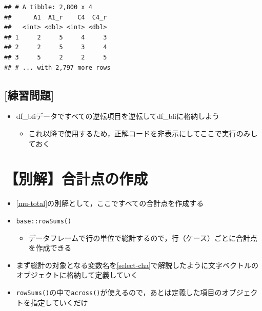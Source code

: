 \documentclass[
  xelatex,ja=standard, b5paper]{bxjsbook}
\providecommand{\tightlist}{%
  \setlength{\itemsep}{0pt}\setlength{\parskip}{0pt}}
\begin{document}
\begin{verbatim}
## # A tibble: 2,800 x 4
##      A1  A1_r    C4  C4_r
##   <int> <dbl> <int> <dbl>
## 1     2     5     4     3
## 2     2     5     3     4
## 3     5     2     2     5
## # ... with 2,797 more rows
\end{verbatim}

\hypertarget{ux7df4ux7fd2ux554fux984c-13}{%
\subsection{{[}練習問題{]}}\label{ux7df4ux7fd2ux554fux984c-13}}

\begin{itemize}
\tightlist
\item
  df\_bfiデータですべての逆転項目を逆転してdf\_bfiに格納しよう

  \begin{itemize}
  \tightlist
  \item
    これ以降で使用するため，正解コードを非表示にしてここで実行のみしておく
  \end{itemize}
\end{itemize}

\hypertarget{mu-total-ef}{%
\section{【別解】合計点の作成}\label{mu-total-ef}}

\begin{itemize}
\tightlist
\item
  \ref{mu-total}の別解として，ここですべての合計点を作成する
\item
  \texttt{base::rowSums()}

  \begin{itemize}
  \tightlist
  \item
    データフレームで行の単位で総計するので，行（ケース）ごとに合計点を作成できる
  \end{itemize}
\item
  まず総計の対象となる変数名を\ref{select-cha}で解説したように文字ベクトルのオブジェクトに格納して定義していく
\item
  \texttt{rowSums()}の中で\texttt{across()}が使えるので，あとは定義した項目のオブジェクトを指定していくだけ
\end{itemize}
\end{document}
